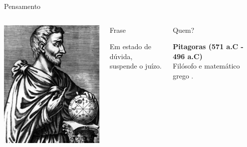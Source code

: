 \documentclass[xcolor=dvipsnames,table]{beamer}
\begin{document}
	\begin{frame}{Pensamento}
		\begin{columns}
		  		\begin{center}
		    		\includegraphics[width=.9\textwidth]{images/pitagoras.jpg}
		  		\end{center}
				\begin{block}{Frase}
					\begin{center}
						{\large Em estado de dúvida, \\suspende o juízo.}
					\end{center}
				\end{block}		  		
		  		\begin{block}{Quem?}
		  			\begin{center}
						{\bf Pitagoras (571 a.C - 496 a.C)} \\Filósofo e matemático grego .
					\end{center}
				\end{block}
		\end{columns}
	\end{frame}
	
\end{document}
